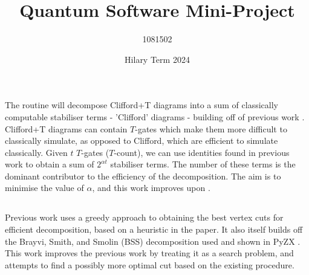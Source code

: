 \documentclass[11pt]{article} %
\title{Quantum Software Mini-Project}
\author{1081502}
\date{Hilary Term 2024}
\theoremstyle{definition}
\begin{document}
%
\maketitle




\section{}
\subsection{}
The routine will decompose Clifford+T diagrams into a sum of classically computable stabiliser terms 
- 'Clifford' diagrams - building off of previous work \cite{sutcliffe2024procedurally, Kissinger_2022}.
Clifford+T diagrams can contain $T$-gates which make them more difficult to classically simulate, 
as opposed to Clifford, which are efficient to simulate classically.
Given $t$ $T$-gates ($T$-count), we can use identities found in previous work 
to obtain a sum of $2^{\alpha t}$ stabiliser terms.
The number of these terms is the dominant contributor to the efficiency of the decomposition.
The aim is to minimise the value of $\alpha$, and this work improves upon \cite{sutcliffe2024procedurally}.

\subsection{}
Previous work \cite{sutcliffe2024procedurally} uses a greedy approach to obtaining the best vertex cuts 
for efficient decomposition, based on a heuristic in the paper.
It also itself builds off the Brayvi, Smith, and Smolin (BSS) decomposition \cite{BSS2016} used 
and shown in PyZX \cite{kissinger2020Pyzx}.
This work improves the previous work by treating it as a search problem, 
and attempts to find a possibly more optimal cut based on the existing procedure.
\end{document}
